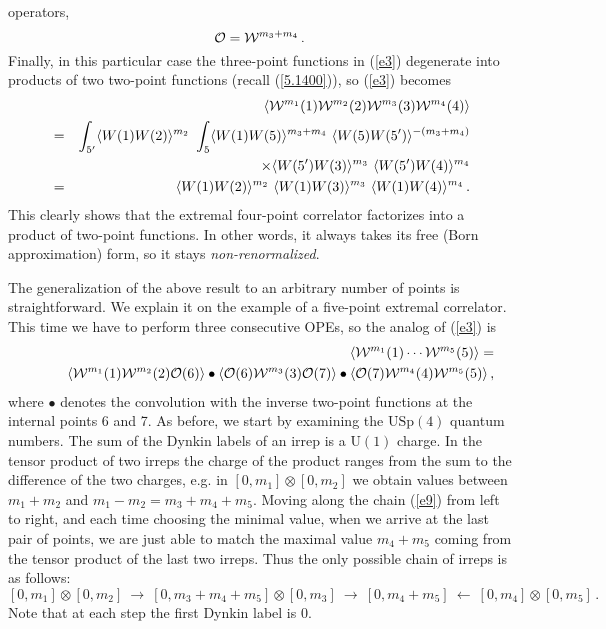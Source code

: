 \documentclass[a4paper,11pt]{article}
\begin{document}
operators,
\begin{equation}\label{e7}
  {\cal O} =  {\cal W}^{m_3+m_4}\,.
\end{equation}
Finally, in this particular case the three-point functions in (\ref{e3})
degenerate into products of two two-point functions (recall (\ref{5.1400})), so
(\ref{e3}) becomes
\begin{eqnarray}
  && \hskip-2cm \langle {\cal W}^{m_1}(1) {\cal W}^{m_2}(2) {\cal W}^{m_3}(3) {\cal W}^{m_4}(4) \rangle
  \label{e8} \\
  &=&\int_{5'}  \langle W(1) W(2) \rangle^{m_2} \ \int_{5} \langle W(1) W(5) \rangle^{m_3+m_4} \
  \langle W(5) W(5') \rangle^{-(m_3+m_4)}    \nonumber\\
  &&\qquad \times  \langle W(5') W(3) \rangle^{m_3}\
   \langle W(5') W(4) \rangle^{m_4}      \nonumber\\
  &=& \langle W(1) W(2) \rangle^{m_2} \ \langle W(1) W(3) \rangle^{m_3} \
  \langle W(1) W(4) \rangle^{m_4} \,. \nonumber
\end{eqnarray}
This clearly shows that the extremal four-point correlator factorizes into a
product of two-point functions. In other words, it always takes its free (Born
approximation) form, so it stays {\it non-renormalized}.

The generalization of the above result to an arbitrary number of points is
straightforward. We explain it on the example of a five-point extremal
correlator. This time we have to perform three consecutive OPEs, so the analog
of (\ref{e3}) is
\begin{eqnarray}
  && \langle {\cal W}^{m_1}(1) \cdots {\cal W}^{m_5}(5) \rangle =
  \label{e9} \\
  &&\qquad
  \langle {\cal W}^{m_1}(1) {\cal W}^{m_2}(2) {\cal O}(6) \rangle \bullet
  \langle  {\cal O}(6) {\cal W}^{m_3}(3) {\cal O}(7) \rangle \bullet
\langle  {\cal O}(7)  {\cal W}^{m_4}(4) {\cal W}^{m_5}(5)\rangle \nonumber \, ,
\end{eqnarray}
where $\bullet$ denotes the convolution with the inverse two-point functions at
the internal points 6 and 7. As before, we start by examining the
$\mbox{USp}(4)$ quantum numbers. The sum of the Dynkin labels of an irrep is a
$\mbox{U}(1)$ charge. In the tensor product of two irreps the charge of the
product ranges from the sum to the difference of the two charges, e.g. in
$[0,m_1]\otimes [0,m_2]$ we obtain values between $m_1+m_2$ and
$m_1-m_2=m_3+m_4+m_5$. Moving along the chain (\ref{e9}) from left to right,
and each time choosing the minimal value, when we arrive at the last pair of
points, we are just able to match the maximal value $m_4+m_5$ coming from the
tensor product of the last two irreps. Thus the only possible chain of irreps
is as follows:
\begin{equation}\label{e10}
  [0,m_1]\otimes [0,m_2] \ \rightarrow \
  [0,m_3+m_4+m_5]\otimes [0,m_3] \ \rightarrow \
  [0,m_4+m_5] \ \leftarrow \  [0,m_4]\otimes [0,m_5]\,.
\end{equation}
Note that at each step the first Dynkin label is 0.
\end{document}
